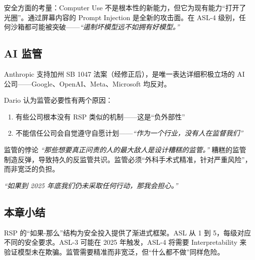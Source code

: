安全方面的考量：Computer Use 不是根本性的新能力，但它为现有能力``打开了光圈''。通过屏幕内容的 Prompt Injection 是全新的攻击面。在 ASL-4 级别，任何沙箱都可能被突破——\textit{``遏制坏模型远不如拥有好模型。''}

\subsection{AI 监管}

Anthropic 支持加州 SB 1047 法案（经修正后），是唯一表达详细积极立场的 AI 公司——Google、OpenAI、Meta、Microsoft 均反对。

Dario 认为监管必要性有两个原因：
\begin{enumerate}
    \item 有些公司根本没有 RSP 类似的机制——这是``负外部性''
    \item 不能信任公司会自觉遵守自愿计划——\textit{``作为一个行业，没有人在监督我们''}
\end{enumerate}

\begin{warningbox}{监管的悖论}
\textit{``那些想要真正问责的人的最大敌人是设计糟糕的监管。''} 糟糕的监管制造反弹，导致持久的反监管共识。监管必须``外科手术式精准，针对严重风险''，而非宽泛的负担。

\textit{``如果到 2025 年底我们仍未采取任何行动，那我会担心。''}
\end{warningbox}

\subsection{本章小结}

RSP 的``如果-那么''结构为安全投入提供了渐进式框架。ASL 从 1 到 5，每级对应不同的安全要求。ASL-3 可能在 2025 年触发，ASL-4 将需要 Interpretability 来验证模型未在欺骗。监管需要精准而非宽泛，但``什么都不做''同样危险。

